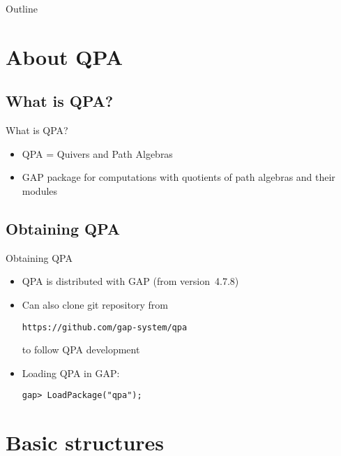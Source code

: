 \newcommand{\QPAIntroPartNumber}{1}




\begin{frame}
  \titlepage
\end{frame}

\begin{frame}{Outline}
  \tableofcontents
\end{frame}

\section{About QPA}

\subsection{What is QPA?}

\begin{frame}{What is QPA?}
\begin{itemize}
\item QPA = Quivers and Path Algebras
\item GAP package for computations with quotients of path algebras
and their modules
\end{itemize}
\end{frame}

\subsection{Obtaining QPA}

\begin{frame}[fragile]{Obtaining QPA}
\begin{itemize}
\item QPA is distributed with GAP (from version~4.7.8)
\item Can also clone git repository from
\begin{center}\texttt{https://github.com/gap-system/qpa}\end{center}
to follow QPA development
\item Loading QPA in GAP:
\begin{verbatim}
gap> LoadPackage("qpa");
\end{verbatim}
\end{itemize}
\end{frame}


\section{Basic structures}

